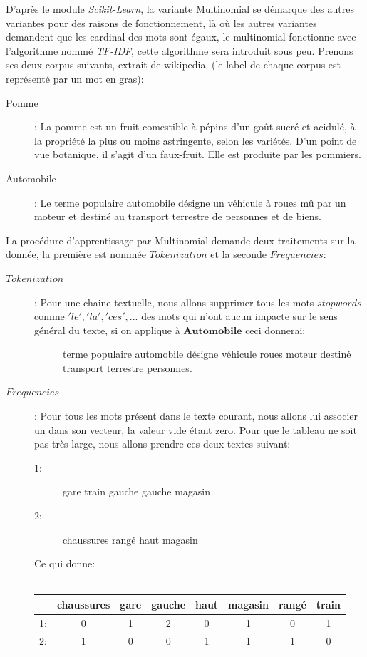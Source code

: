 D'après le module \textit{Scikit-Learn}, la variante Multinomial se démarque des autres variantes pour des raisons de fonctionnement, là où les autres variantes demandent que les cardinal des mots sont égaux, le multinomial fonctionne avec l'algorithme nommé \textit{TF-IDF}, cette algorithme sera introduit sous peu.\linebreak
\linebreak
Prenons ses deux corpus suivants, extrait de wikipedia. (le label de chaque corpus est représenté par un mot en gras):\\
\begin{description}
\item[Pomme]: La pomme est un fruit comestible à pépins d'un goût sucré et acidulé, à la propriété la plus ou moins astringente, selon les variétés. D'un point de vue botanique, il s'agit d'un faux-fruit. Elle est produite par les pommiers.
\item[Automobile]: Le terme populaire automobile désigne un véhicule à roues mû par un moteur et destiné au transport terrestre de personnes et de biens.
\end{description}

\pagebreak

La procédure d'apprentissage par Multinomial demande deux traitements sur la donnée, la première est nommée $Tokenization$ et la seconde $Frequencies$:\\
\begin{description}
\item[$Tokenization$]: Pour une chaine textuelle, nous allons supprimer tous les mots $stopwords$ comme $'le','la','ces',...$ des mots qui n'ont aucun impacte sur le sens général du texte, si on applique à $\textbf{Automobile}$ ceci donnerai: 
\begin{description}
\item[] terme populaire automobile désigne véhicule roues moteur destiné transport terrestre personnes.
\end{description}

\item[$Frequencies$]: Pour tous les mots présent dans le texte courant, nous allons lui associer un dans son vecteur, la valeur vide étant zero. Pour que le tableau ne soit pas très large, nous allons prendre ces deux textes suivant: 
\begin{description}
\item[1:] gare train gauche gauche magasin
\item[2:] chaussures rangé haut magasin
\end{description}
Ce qui donne:\\\\
\begin{tabular}{c|c|c|c|c|c|c|c}
$-$ & chaussures & gare & gauche & haut & magasin & rangé & train\\
\hline
1: & 0 & 1 & 2 & 0 & 1 & 0 & 1\\
2: & 1 & 0 & 0 & 1 & 1 & 1 & 0\\
\end{tabular}
\end{description}

